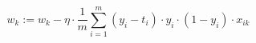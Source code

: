 \begin{equation}
    w_k := w_k - \eta \cdot \frac{1}{m} \sum_{i=1}^{m} (y_i - t_i) \cdot y_i \cdot (1 - y_i) \cdot x_{ik}
    \label{eq:batch_gd}
\end{equation}
